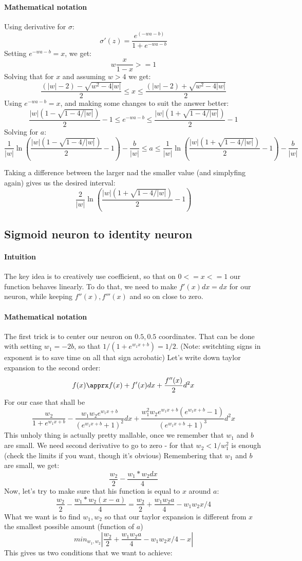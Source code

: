 \documentclass{article}
\begin{document}
\paragraph{Mathematical notation}
Using derivative for $\sigma$:
$$\sigma'(z) = \frac{e^(-wa-b)}{1 + e^{-wa-b}}$$
Setting $e^{-wa-b} = x$, we get:
$$w \frac{x}{1-x} >= 1$$
Solving that for $x$ and assuming $w > 4$ we get:
$$\frac{(|w|-2)-\sqrt{w^2-4|w|}}{2} \leq x \leq \frac{(|w|-2)+\sqrt{w^2-4|w|}}{2}$$
Using $e^{-wa-b} = x$, and making some changes to suit the answer better:
$$\frac{|w|\left(1-\sqrt{1-4/|w|}\right)}{2}-1 \leq e^{-wa-b} \leq \frac{|w|\left(1+\sqrt{1-4/|w|}\right)}{2}-1$$
Solving for $a$:
$$\frac{1}{|w|}\ln\left(\frac{|w|\left(1-\sqrt{1-4/|w|}\right)}{2}-1\right) - \frac{b}{|w|}\leq a \leq \frac{1}{|w|}\ln\left(\frac{|w|\left(1+\sqrt{1-4/|w|}\right)}{2}-1\right)-\frac{b}{|w|}$$

Taking a difference between the larger nad the smaller value (and simplyfing again) gives us the desired interval:
$$\frac{2}{|w|} \ln{\left(\frac{|w|(1+\sqrt{1-4/|w|})}{2}-1\right)}$$

\subsection{Sigmoid neuron to identity neuron}
\paragraph{Intuition}
The key idea is to creatively use coefficient, so that on $0 <= x <= 1$ our function behaves linearly.
To do that, we need to make $f'(x)dx = dx$ for our neuron, while keeping $f''(x), f'''(x)$ and so on close to zero.
\paragraph{Mathematical notation}
The first trick is to center our neuron on ${0.5, 0.5}$ coordinates.
That can be done with setting $w_1 = -2b$, so that $1/(1+e^{w_1x + b}) = 1/2$.
(Note: switchting signs in exponent is to save time on all that sign acrobatic)
Let's write down taylor expansion to the second order:
$$f(x) \apprx f(x) + f'(x)dx + \frac{f''(x)}{2} d^2x$$
For our case that shall be
$$\frac{w_2}{1 + e^{w_1x+b}} - \frac{w_1w_2 e^{w_1x+b}}{(e^{w_1x+b} + 1)^2} dx + \frac{w_{1}^{2} w_2 e^{w_1x+b} (e^{w_1x+b} - 1) }{(e^{w_1x+b} + 1)^3} d^2x$$
This unholy thing is actually pretty mallable, once we remember that $w_1$ and $b$ are small.
We need second derivative to go to zero - for that $w_2 < 1/w_{1}^2$ is enough (check the limits if you want, though it's obvious)
Remembering that $w_1$ and $b$ are small, we get:
$$\frac{w_2}{2} - \frac{w_1 * w_2 dx}{4}$$
Now, let's try to make sure that his function is equal to $x$ around $a$:
$$\frac{w_2}{2} - \frac{w_1*w_2 (x - a)}{4} = \frac{w_2}{2} + \frac{w_1 w_2 a}{4} - w_1w_2x/4$$
What we want is to find $w_1, w_2$ so that our taylor expansion is different from $x$ the smallest possible amount (function of $a$)
$$min_{w_1, w_2}|\frac{w_2}{2} + \frac{w_1 w_2 a}{4} - w_1w_2x/4 - x| $$
This gives us two conditions that we want to achieve:
\end{document}
